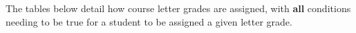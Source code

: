\documentclass[12pt]{article}
\begin{document}
        The tables below detail how course letter grades are assigned, with {\color{red}\textbf{all}} conditions needing to be true for a student to be assigned a given letter grade. 

\end{document}
